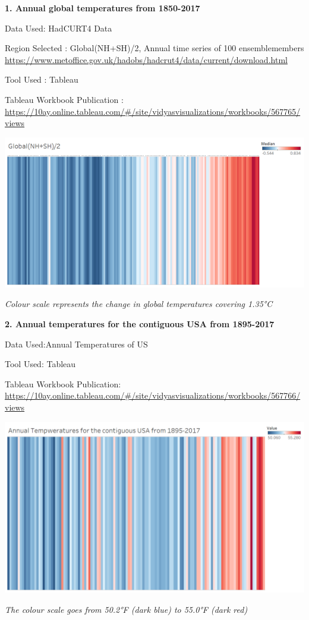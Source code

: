\documentclass[]{book}
\begin{document}
\textbf{1. Annual global temperatures from 1850-2017}

Data Used: HadCURT4 Data

Region Selected : Global(NH+SH)/2, Annual time series of 100 ensemblemembers \url{https://www.metoffice.gov.uk/hadobs/hadcrut4/data/current/download.html}

Tool Used : Tableau

Tableau Workbook Publication : \url{https://10ay.online.tableau.com/\#/site/vidyasvisualizations/workbooks/567765/views}

\includegraphics{images/Global_WarmingStrips.png}

\emph{Colour scale represents the change in global temperatures covering 1.35°C}

\textbf{2. Annual temperatures for the contiguous USA from 1895-2017}

Data Used:Annual Temperatures of US \citep{NOAA}

Tool Used: Tableau

Tableau Workbook Publication: \url{https://10ay.online.tableau.com/\#/site/vidyasvisualizations/workbooks/567766/views}

\includegraphics{images/US_WarmingStrips.png}

\emph{The colour scale goes from 50.2°F (dark blue) to 55.0°F (dark red)}


\end{document}
